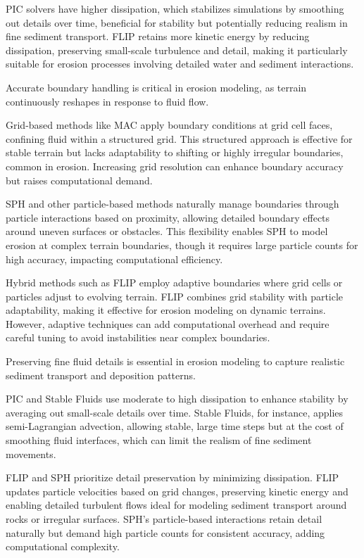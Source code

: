 PIC solvers have higher dissipation, which stabilizes simulations by smoothing out details over time, beneficial for stability but potentially reducing realism in fine sediment transport. FLIP retains more kinetic energy by reducing dissipation, preserving small-scale turbulence and detail, making it particularly suitable for erosion processes involving detailed water and sediment interactions.


Accurate boundary handling is critical in erosion modeling, as terrain continuously reshapes in response to fluid flow.

Grid-based methods like MAC apply boundary conditions at grid cell faces, confining fluid within a structured grid. This structured approach is effective for stable terrain but lacks adaptability to shifting or highly irregular boundaries, common in erosion. Increasing grid resolution can enhance boundary accuracy but raises computational demand.

SPH and other particle-based methods naturally manage boundaries through particle interactions based on proximity, allowing detailed boundary effects around uneven surfaces or obstacles. This flexibility enables SPH to model erosion at complex terrain boundaries, though it requires large particle counts for high accuracy, impacting computational efficiency.

Hybrid methods such as FLIP employ adaptive boundaries where grid cells or particles adjust to evolving terrain. FLIP combines grid stability with particle adaptability, making it effective for erosion modeling on dynamic terrains. However, adaptive techniques can add computational overhead and require careful tuning to avoid instabilities near complex boundaries.


Preserving fine fluid details is essential in erosion modeling to capture realistic sediment transport and deposition patterns.

PIC and Stable Fluids use moderate to high dissipation to enhance stability by averaging out small-scale details over time. Stable Fluids, for instance, applies semi-Lagrangian advection, allowing stable, large time steps but at the cost of smoothing fluid interfaces, which can limit the realism of fine sediment movements.

FLIP and SPH prioritize detail preservation by minimizing dissipation. FLIP updates particle velocities based on grid changes, preserving kinetic energy and enabling detailed turbulent flows ideal for modeling sediment transport around rocks or irregular surfaces. SPH's particle-based interactions retain detail naturally but demand high particle counts for consistent accuracy, adding computational complexity.


